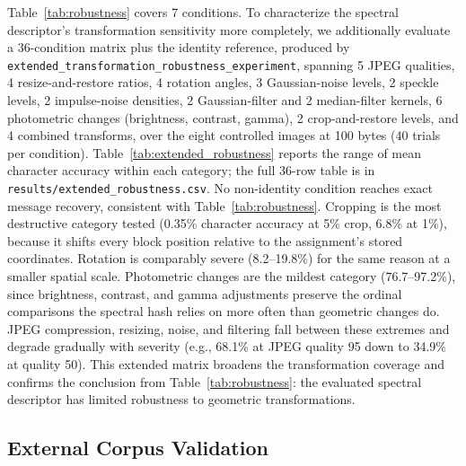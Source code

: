 \documentclass[preprint,12pt]{elsarticle}
\theoremstyle{plain}
\begin{document}
Table~\ref{tab:robustness} covers 7 conditions. To characterize the spectral
descriptor's transformation sensitivity more completely, we additionally
evaluate a 36-condition matrix plus the identity reference, produced by
\texttt{extended\_transformation\_robustness\_experiment}, spanning 5 JPEG
qualities, 4 resize-and-restore ratios, 4 rotation angles, 3 Gaussian-noise
levels, 2 speckle levels, 2 impulse-noise densities, 2 Gaussian-filter and 2
median-filter kernels, 6 photometric changes (brightness, contrast, gamma),
2 crop-and-restore levels, and 4 combined transforms, over the eight
controlled images at 100 bytes (40 trials per condition). Table~\ref{tab:extended_robustness}
reports the range of mean character accuracy within each category; the full
36-row table is in \texttt{results/extended\_robustness.csv}. No non-identity
condition reaches exact message recovery, consistent with
Table~\ref{tab:robustness}. Cropping is the most destructive category tested
(0.35\% character accuracy at 5\% crop, 6.8\% at 1\%), because it shifts
every block position relative to the assignment's stored coordinates.
Rotation is comparably severe (8.2--19.8\%) for the same reason at a smaller
spatial scale. Photometric changes are the mildest category (76.7--97.2\%),
since brightness, contrast, and gamma adjustments preserve the ordinal
comparisons the spectral hash relies on more often than geometric changes
do. JPEG compression, resizing, noise, and filtering fall between these
extremes and degrade gradually with severity (e.g., 68.1\% at JPEG quality 95
down to 34.9\% at quality 50). This extended matrix broadens the
transformation coverage and confirms the conclusion from Table~\ref{tab:robustness}:
the evaluated spectral descriptor has limited robustness to geometric transformations.

\begin{table}[!t]
\centering
\caption{Extended Transformation Matrix: Character Accuracy Range by Category (100 Bytes, 40 Trials per Condition)}
\label{tab:extended_robustness}

\end{table}

\subsection{External Corpus Validation}
\end{document}
